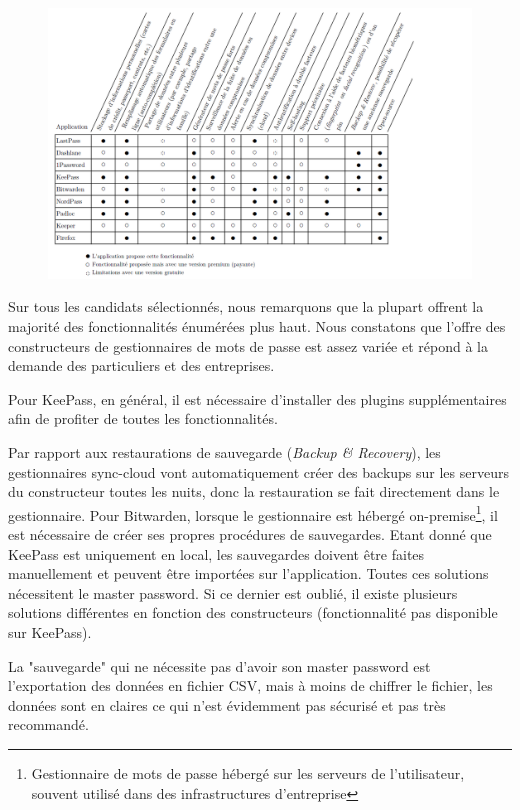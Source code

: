 	\begin{figure}[H]
		\centering
		\includegraphics[width=18cm]{images/fonctionnalites.png}
	\end{figure}


Sur tous les candidats sélectionnés, nous remarquons que la plupart offrent la majorité des fonctionnalités énumérées plus haut. Nous constatons que l'offre des constructeurs de gestionnaires de mots de passe est assez variée et répond à la demande des particuliers et des entreprises.

Pour KeePass, en général, il est nécessaire d'installer des plugins supplémentaires afin de profiter de toutes les fonctionnalités.

Par rapport aux restaurations de sauvegarde (\textit{Backup \& Recovery}), les gestionnaires sync-cloud vont automatiquement créer des backups sur les serveurs du constructeur toutes les nuits, donc la restauration se fait directement dans le gestionnaire. Pour Bitwarden, lorsque le gestionnaire est hébergé on-premise\footnote{Gestionnaire de mots de passe hébergé sur les serveurs de l'utilisateur, souvent utilisé dans des infrastructures d'entreprise}, il est nécessaire de créer ses propres procédures de sauvegardes. Etant donné que KeePass est uniquement en local, les sauvegardes doivent être faites manuellement et peuvent être importées sur l'application. Toutes ces solutions nécessitent le master password. Si ce dernier est oublié, il existe plusieurs solutions différentes en fonction des constructeurs (fonctionnalité pas disponible sur KeePass). 

La "sauvegarde" qui ne nécessite pas d'avoir son master password est l'exportation des données en fichier CSV, mais à moins de chiffrer le fichier, les données sont en claires ce qui n'est évidemment pas sécurisé et pas très recommandé.
